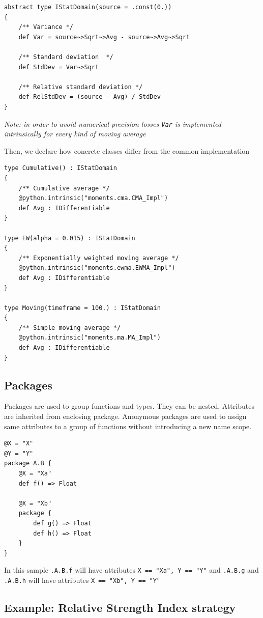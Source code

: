 \documentclass[a4paper,11pt]{article}
\begin{document}
\begin{verbatim}
abstract type IStatDomain(source = .const(0.))
{
    /** Variance */
    def Var = source~>Sqrt~>Avg - source~>Avg~>Sqrt
    
    /** Standard deviation  */
    def StdDev = Var~>Sqrt

    /** Relative standard deviation */
    def RelStdDev = (source - Avg) / StdDev
}
\end{verbatim}

\textit{Note: in order to avoid numerical precision losses \texttt{Var} is implemented intrinsically for every kind of moving average}

Then, we declare how concrete classes differ from the common implementation

\begin{verbatim}
type Cumulative() : IStatDomain
{
    /** Cumulative average */
    @python.intrinsic("moments.cma.CMA_Impl")
    def Avg : IDifferentiable
}

type EW(alpha = 0.015) : IStatDomain
{
    /** Exponentially weighted moving average */
    @python.intrinsic("moments.ewma.EWMA_Impl")
    def Avg : IDifferentiable
}

type Moving(timeframe = 100.) : IStatDomain
{
    /** Simple moving average */
    @python.intrinsic("moments.ma.MA_Impl")
    def Avg : IDifferentiable
}
\end{verbatim}

\subsection{Packages}

Packages are used to group functions and types. They can be nested. Attributes are inherited from enclosing package. Anonymous packages are used to assign same attributes to a group of functions without introducing a new name scope.

\begin{verbatim}
@X = "X"
@Y = "Y"
package A.B {
    @X = "Xa"
    def f() => Float
    
    @X = "Xb"
    package {
        def g() => Float
        def h() => Float
    }
}
\end{verbatim}

In this sample \texttt{.A.B.f} will have attributes \texttt{X == "Xa", Y == "Y"} and \texttt{.A.B.g} and \texttt{.A.B.h} will have attributes \texttt{X == "Xb", Y == "Y"}

\subsection{Example: Relative Strength Index strategy}\label{RSI}
\end{document}
